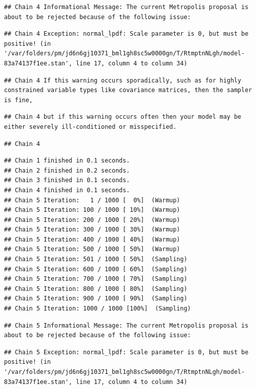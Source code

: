 \documentclass[
]{book}
\begin{document}
\begin{verbatim}
## Chain 4 Informational Message: The current Metropolis proposal is about to be rejected because of the following issue:
\end{verbatim}

\begin{verbatim}
## Chain 4 Exception: normal_lpdf: Scale parameter is 0, but must be positive! (in '/var/folders/pm/jd6n6gj10371_bml1gh8sc5w0000gn/T/RtmptnNLgh/model-83a74137f1ee.stan', line 17, column 4 to column 34)
\end{verbatim}

\begin{verbatim}
## Chain 4 If this warning occurs sporadically, such as for highly constrained variable types like covariance matrices, then the sampler is fine,
\end{verbatim}

\begin{verbatim}
## Chain 4 but if this warning occurs often then your model may be either severely ill-conditioned or misspecified.
\end{verbatim}

\begin{verbatim}
## Chain 4
\end{verbatim}

\begin{verbatim}
## Chain 1 finished in 0.1 seconds.
## Chain 2 finished in 0.2 seconds.
## Chain 3 finished in 0.1 seconds.
## Chain 4 finished in 0.1 seconds.
## Chain 5 Iteration:   1 / 1000 [  0%]  (Warmup) 
## Chain 5 Iteration: 100 / 1000 [ 10%]  (Warmup) 
## Chain 5 Iteration: 200 / 1000 [ 20%]  (Warmup) 
## Chain 5 Iteration: 300 / 1000 [ 30%]  (Warmup) 
## Chain 5 Iteration: 400 / 1000 [ 40%]  (Warmup) 
## Chain 5 Iteration: 500 / 1000 [ 50%]  (Warmup) 
## Chain 5 Iteration: 501 / 1000 [ 50%]  (Sampling) 
## Chain 5 Iteration: 600 / 1000 [ 60%]  (Sampling) 
## Chain 5 Iteration: 700 / 1000 [ 70%]  (Sampling) 
## Chain 5 Iteration: 800 / 1000 [ 80%]  (Sampling) 
## Chain 5 Iteration: 900 / 1000 [ 90%]  (Sampling) 
## Chain 5 Iteration: 1000 / 1000 [100%]  (Sampling)
\end{verbatim}

\begin{verbatim}
## Chain 5 Informational Message: The current Metropolis proposal is about to be rejected because of the following issue:
\end{verbatim}

\begin{verbatim}
## Chain 5 Exception: normal_lpdf: Scale parameter is 0, but must be positive! (in '/var/folders/pm/jd6n6gj10371_bml1gh8sc5w0000gn/T/RtmptnNLgh/model-83a74137f1ee.stan', line 17, column 4 to column 34)
\end{verbatim}
\end{document}
